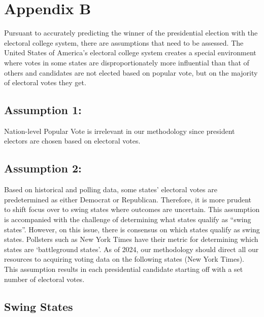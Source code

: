 \documentclass[
  letterpaper,
  DIV=11,
  numbers=noendperiod]{scrartcl}
\begin{document}
\newpage

\hypertarget{appendix-b}{%
\section*{Appendix B}\label{appendix-b}}

Pursuant to accurately predicting the winner of the presidential
election with the electoral college system, there are assumptions that
need to be assessed. The United States of America's electoral college
system creates a special environment where votes in some states are
disproportionately more influential than that of others and candidates
are not elected based on popular vote, but on the majority of electoral
votes they get.

\hypertarget{assumption-1}{%
\subsection{Assumption 1:}\label{assumption-1}}

Nation-level Popular Vote is irrelevant in our methodology since
president electors are chosen based on electoral votes.

\hypertarget{assumption-2}{%
\subsection{Assumption 2:}\label{assumption-2}}

Based on historical and polling data, some states' electoral votes are
predetermined as either Democrat or Republican. Therefore, it is more
prudent to shift focus over to swing states where outcomes are
uncertain. This assumption is accompanied with the challenge of
determining what states qualify as ``swing states''. However, on this
issue, there is consensus on which states qualify as swing states.
Pollsters such as New York Times have their metric for determining which
states are `battleground states'. As of 2024, our methodology should
direct all our resources to acquiring voting data on the following
states (New York Times). This assumption results in each presidential
candidate starting off with a set number of electoral votes.

\hypertarget{swing-states}{%
\subsection{Swing States}\label{swing-states}}
\end{document}
